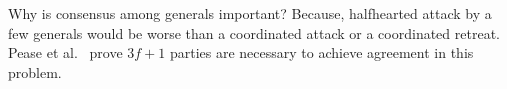 \documentclass[11pt]{article}
\theoremstyle{mytheoremstyle}
\begin{document}
Why is consensus among generals important? Because, halfhearted attack by a few generals would be worse than a coordinated attack or a coordinated retreat. Pease et al.~\cite{pease80reaching} prove $3f+1$ parties are necessary to achieve agreement in this problem.


\end{document}
